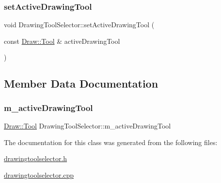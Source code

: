 \mbox{\label{class_drawing_tool_selector_a4d16b789abf92b987ee255c31e887cf0}} 
\subsubsection{\texorpdfstring{set\+Active\+Drawing\+Tool}{setActiveDrawingTool}}
{\footnotesize\ttfamily void Drawing\+Tool\+Selector\+::set\+Active\+Drawing\+Tool (\begin{DoxyParamCaption}\item[{const \hyperlink{class_draw_aef97a848de7a634c35c3ce678be88b9b}{Draw\+::\+Tool} \&}]{active\+Drawing\+Tool }\end{DoxyParamCaption})\hspace{0.3cm}{\ttfamily [slot]}}



\subsection{Member Data Documentation}
\mbox{\label{class_drawing_tool_selector_ab5f16b690e91d1847f985580accbf79f}} 
\subsubsection{\texorpdfstring{m\+\_\+active\+Drawing\+Tool}{m\_activeDrawingTool}}
{\footnotesize\ttfamily \hyperlink{class_draw_aef97a848de7a634c35c3ce678be88b9b}{Draw\+::\+Tool} Drawing\+Tool\+Selector\+::m\+\_\+active\+Drawing\+Tool\hspace{0.3cm}{\ttfamily [protected]}}



The documentation for this class was generated from the following files\+:\begin{DoxyCompactItemize}
\item 
\hyperlink{drawingtoolselector_8h}{drawingtoolselector.\+h}\item 
\hyperlink{drawingtoolselector_8cpp}{drawingtoolselector.\+cpp}\end{DoxyCompactItemize}
